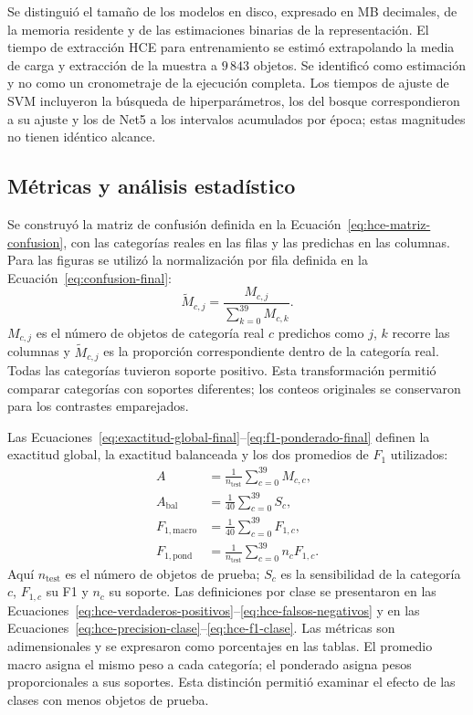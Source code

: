 Se distinguió el tamaño de los modelos en disco, expresado en MB decimales, de la memoria residente y de las estimaciones binarias de la representación. El tiempo de extracción HCE para entrenamiento se estimó extrapolando la media de carga y extracción de la muestra a $9\,843$ objetos. Se identificó como estimación y no como un cronometraje de la ejecución completa. Los tiempos de ajuste de SVM incluyeron la búsqueda de hiperparámetros, los del bosque correspondieron a su ajuste y los de Net5 a los intervalos acumulados por época; estas magnitudes no tienen idéntico alcance.

\subsection{Métricas y análisis estadístico}
\label{subsec:metricas-analisis}
Se construyó la matriz de confusión definida en la Ecuación~\eqref{eq:hce-matriz-confusion}, con las categorías reales en las filas y las predichas en las columnas. Para las figuras se utilizó la normalización por fila definida en la Ecuación~\eqref{eq:confusion-final}:
\begin{equation}\label{eq:confusion-final}
\widetilde M_{c,j}=\frac{M_{c,j}}{\sum_{k=0}^{39}M_{c,k}}.
\end{equation}
$M_{c,j}$ es el número de objetos de categoría real $c$ predichos como $j$, $k$ recorre las columnas y $\widetilde M_{c,j}$ es la proporción correspondiente dentro de la categoría real. Todas las categorías tuvieron soporte positivo. Esta transformación permitió comparar categorías con soportes diferentes; los conteos originales se conservaron para los contrastes emparejados.

Las Ecuaciones~\eqref{eq:exactitud-global-final}--\eqref{eq:f1-ponderado-final} definen la exactitud global, la exactitud balanceada y los dos promedios de $F_1$ utilizados:
\begin{subequations}\label{eq:metricas-agregadas}
\begin{align}
A&=\frac{1}{n_{\mathrm{test}}}\sum_{c=0}^{39}M_{c,c}, \label{eq:exactitud-global-final} \\
A_{\mathrm{bal}}&=\frac{1}{40}\sum_{c=0}^{39}S_c, \label{eq:exactitud-balanceada-final} \\
F_{1,\mathrm{macro}}&=\frac{1}{40}\sum_{c=0}^{39}F_{1,c}, \label{eq:f1-macro-final} \\
F_{1,\mathrm{pond}}&=\frac{1}{n_{\mathrm{test}}}\sum_{c=0}^{39}n_c F_{1,c}. \label{eq:f1-ponderado-final}
\end{align}
\end{subequations}
Aquí $n_{\mathrm{test}}$ es el número de objetos de prueba; $S_c$ es la sensibilidad de la categoría $c$, $F_{1,c}$ su F1 y $n_c$ su soporte. Las definiciones por clase se presentaron en las Ecuaciones~\eqref{eq:hce-verdaderos-positivos}--\eqref{eq:hce-falsos-negativos} y en las Ecuaciones~\eqref{eq:hce-precision-clase}--\eqref{eq:hce-f1-clase}. Las métricas son adimensionales y se expresaron como porcentajes en las tablas. El promedio macro asigna el mismo peso a cada categoría; el ponderado asigna pesos proporcionales a sus soportes. Esta distinción permitió examinar el efecto de las clases con menos objetos de prueba.


